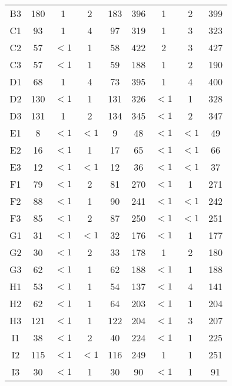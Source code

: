 \begin{center}
\begin{longtable}{ccccc|cccc}
    B3    & 180   & 1     & 2     & 183   & 396   & 1     & 2     & 399 \\
    C1    & 93    & 1     & 4     & 97    & 319   & 1     & 3     & 323 \\
    C2    & 57    & $<1$     & 1     & 58    & 422   & 2     & 3     & 427 \\
    C3    & 57    & $<1$     & 1     & 59    & 188   & 1     & 2     & 190 \\
    D1    & 68    & 1     & 4     & 73    & 395   & 1     & 4     & 400 \\
    D2    & 130   & $<1$     & 1     & 131   & 326   & $<1$     & 1     & 328 \\
    D3    & 131   & 1     & 2     & 134   & 345   & $<1$     & 2     & 347 \\
    E1    & 8     & $<1$     & $<1$     & 9     & 48    & $<1$     & $<1$     & 49 \\
    E2    & 16    & $<1$     & 1     & 17    & 65    & $<1$     & $<1$     & 66 \\
    E3    & 12    & $<1$     & $<1$     & 12    & 36    & $<1$     & $<1$     & 37 \\
    F1    & 79    & $<1$     & 2     & 81    & 270   & $<1$     & 1     & 271 \\
    F2    & 88    & $<1$     & 1     & 90    & 241   & $<1$     & $<1$     & 242 \\
    F3    & 85    & $<1$     & 2     & 87    & 250   & $<1$     & $<1$     & 251 \\
    G1    & 31    & $<1$     & $<1$     & 32    & 176   & $<1$     & 1     & 177 \\
    G2    & 30    & $<1$     & 2     & 33    & 178   & 1     & 2     & 180 \\
    G3    & 62    & $<1$     & 1     & 62    & 188   & $<1$     & 1     & 188 \\
    H1    & 53    & $<1$     & 1     & 54    & 137   & $<1$     & 4     & 141 \\
    H2    & 62    & $<1$     & 1     & 64    & 203   & $<1$     & 1     & 204 \\
    H3    & 121   & $<1$     & 1     & 122   & 204   & $<1$     & 3     & 207 \\
    I1    & 38    & $<1$     & 2     & 40    & 224   & $<1$     & 1     & 225 \\
    I2    & 115   & $<1$     & $<1$     & 116   & 249   & 1     & 1     & 251 \\
    I3    & 30    & $<1$     & 1     & 30    & 90    & $<1$     & 1     & 91 \\

\end{longtable}
\end{center}
